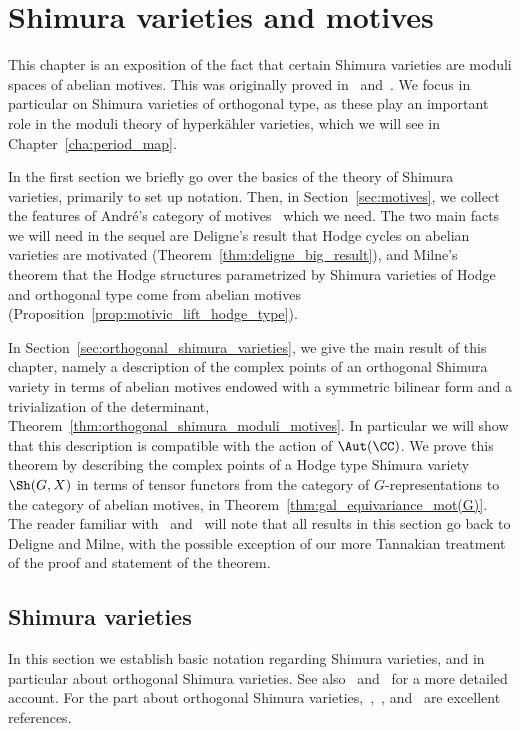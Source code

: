 \chapter{Shimura varieties and motives}\label{cha:shimura_varieties}
This chapter is an exposition of the fact that certain Shimura varieties are moduli spaces of abelian motives. This was originally proved in~\cite{DeligneShimura} and~\cite{MilneShimuraMotives}. We focus in particular on Shimura varieties of orthogonal type, as these play an important role in the moduli theory of hyperk\"ahler varieties, which we will see in Chapter~\ref{cha:period_map}.


In the first section we briefly go over the basics of the theory of Shimura varieties, primarily to set up notation. Then, in Section~\ref{sec:motives}, we collect the features of Andr\'e's category of motives~\cite{AndreInconditionnelle} which we need. The two main facts we will need in the sequel are Deligne's result that Hodge cycles on abelian varieties are motivated (Theorem~\ref{thm:deligne_big_result}), and Milne's theorem that the Hodge structures parametrized by Shimura varieties of Hodge and orthogonal type come from abelian motives (Proposition~\ref{prop:motivic_lift_hodge_type}).

In Section~\ref{sec:orthogonal_shimura_varieties}, we give the main result of this chapter, namely a description of the complex points of an orthogonal Shimura variety in terms of abelian motives endowed with a symmetric bilinear form and a trivialization of the determinant, Theorem~\ref{thm:orthogonal_shimura_moduli_motives}. In particular we will show that this description is compatible with the action of $\Aut(\CC)$. We prove this theorem by describing the complex points of a Hodge type Shimura variety $\Sh(G,X)$ in terms of tensor functors from the category of $G$-representations to the category of abelian motives, in Theorem~\ref{thm:gal_equivariance_mot(G)}. The reader familiar with~\cite{DeligneShimura} and~\cite{MilneShimura} will note that all results in this section go back to Deligne and Milne, with the possible exception of our more Tannakian treatment of the proof and statement of the theorem.

\section{Shimura varieties}\label{sec:shimura_varieties}
In this section we establish basic notation regarding Shimura varieties, and in particular about orthogonal Shimura varieties. See also~\cite{MilneShimura} and~\cite{DeligneShimura} for a more detailed account. For the part about orthogonal Shimura varieties,~\cite{MadapusiPeraIntegralModels},~\cite{DeligneK3}, and~\cite{AndreTateShafarevich} are excellent references.
